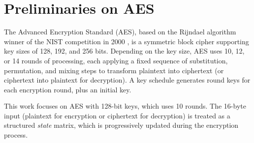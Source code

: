  
\section{Preliminaries on AES}
\label{sec:preliminaries_aes}

The Advanced Encryption Standard (AES), based on the Rijndael algorithm winner of the NIST competition in 2000 \cite{aes-original}, is a symmetric block cipher supporting key sizes of 128, 192, and 256 bits. Depending on the key size, AES uses 10, 12, or 14 rounds of processing, each applying a fixed sequence of substitution, permutation, and mixing steps to transform plaintext into ciphertext (or ciphertext into plaintext for decryption). A key schedule generates round keys for each encryption round, plus an initial key.

This work focuses on AES with 128-bit keys, which uses 10 rounds. The 16-byte input (plaintext for encryption or ciphertext for decryption) is treated as a structured \textit{state} matrix, which is progressively updated during the encryption process.


